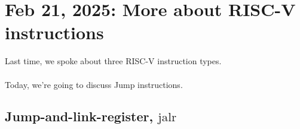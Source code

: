 \documentclass[11pt]{article}
\begin{document}




\pagebreak
\section{Feb 21, 2025: More about RISC-V instructions}

Last time, we spoke about three RISC-V instruction types.
\\
\\
Today, we're going to discuss Jump instructions.

\vskip 1cm
\subsection{Jump-and-link-register, $\mathrm{jalr}$}
\end{document}
